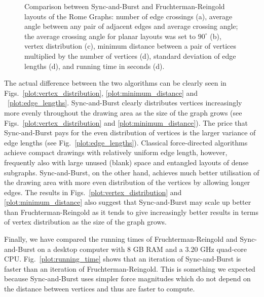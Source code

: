 \documentclass{llncs}
\begin{document}
\begin{figure}
\centering
{}
\caption{Comparison between Sync-and-Burst and Fruchterman-Reingold layouts of the Rome Graphs: number of edge crossings (a), average angle between any pair of adjacent edges and average crossing angle; the average crossing angle for planar layouts was set to $90^{\circ}$ (b), vertex distribution (c), minimum distance between a pair of vertices multiplied by the number of vertices (d), standard deviation of edge lengths (d), and running time in seconds (d).}
\label{fig:plots}
\end{figure}

The actual difference between the two algorithms can be clearly seen in Figs.~\ref{plot:vertex_distribution}, \ref{plot:minimum_distance} and ~\ref{plot:edge_lengths}. Sync-and-Burst clearly distributes vertices increasingly more evenly throughout the drawing area as the size of the graph grows (see Figs.~\ref{plot:vertex_distribution} and \ref{plot:minimum_distance}). The price that Sync-and-Burst pays for the even distribution of vertices is the larger variance of edge lengths (see Fig.~\ref{plot:edge_lengths}). Classical force-directed algorithms achieve compact drawings with relatively uniform edge length, however, frequently also with large unused (blank) space and entangled layouts of dense subgraphs. Sync-and-Burst, on the other hand, achieves much better utilisation of the drawing area with more even distribution of the vertices by allowing longer edges. The results in Figs.~\ref{plot:vertex_distribution} and \ref{plot:minimum_distance} also suggest that Sync-and-Burst may scale up better than Fruchterman-Reingold as it tends to give increasingly better results in terms of vertex distribution as the size of the graph grows.

Finally, we have compared the running times of Fruchterman-Reingold and Sync-and-Burst on a desktop computer with 8 GB RAM and a 3.20 GHz quad-core CPU. Fig.~\ref{plot:running_time} shows that an iteration of Sync-and-Burst is faster than an iteration of Fruchterman-Reingold. This is something we expected because Sync-and-Burst uses simpler force magnitudes which do not depend on the distance between vertices and thus are faster to compute.
\end{document}
